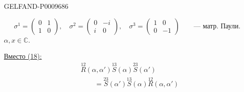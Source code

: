 \begin{GelfandAdjacentEvidence}{GELFAND-P000968}{6}

\[
 \sigma^1=\begin{pmatrix}0&1\\1&0\end{pmatrix},\quad
 \sigma^2=\begin{pmatrix}0&-i\\i&0\end{pmatrix},\quad
 \sigma^3=\begin{pmatrix}1&0\\0&-1\end{pmatrix}
 \qquad\text{--- матр. Паули.}
\]
$\alpha,x\in\mathbb C$.

\underline{Вместо (18):}
\begin{equation*}
\begin{aligned}
 &\overset{12}{R}(\alpha,\alpha')\overset{13}{S}(\alpha)\overset{23}{S}(\alpha')\\
 &\qquad=\overset{23}{S}(\alpha')\overset{13}{S}(\alpha)\overset{12}{R}(\alpha,\alpha')
\end{aligned}\tag{25}
\end{equation*}
\end{GelfandAdjacentEvidence}


